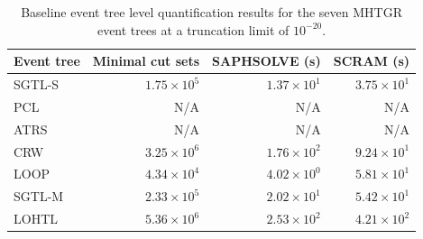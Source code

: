 \begin{table}[]
\centering
\caption{Baseline event tree level quantification results for the seven MHTGR event trees at a truncation limit of $10^{-20}$.}
\label{tab:mhtgr_robust_run1}
\small
\begin{tabular}{@{}lrrr@{}}
\toprule
\textbf{Event tree} & \textbf{Minimal cut sets} & \textbf{SAPHSOLVE (s)} & \textbf{SCRAM (s)} \\
\midrule
SGTL-S & $1.75 \times 10^{5}$ & $1.37 \times 10^{1}$ & $3.75 \times 10^{1}$ \\
PCL & N/A & N/A & N/A \\
ATRS & N/A & N/A & N/A \\
CRW & $3.25 \times 10^{6}$ & $1.76 \times 10^{2}$ & $9.24 \times 10^{1}$ \\
LOOP & $4.34 \times 10^{4}$ & $4.02 \times 10^{0}$ & $5.81 \times 10^{1}$ \\
SGTL-M & $2.33 \times 10^{5}$ & $2.02 \times 10^{1}$ & $5.42 \times 10^{1}$ \\
LOHTL & $5.36 \times 10^{6}$ & $2.53 \times 10^{2}$ & $4.21 \times 10^{2}$ \\
\bottomrule
\end{tabular}
\end{table}